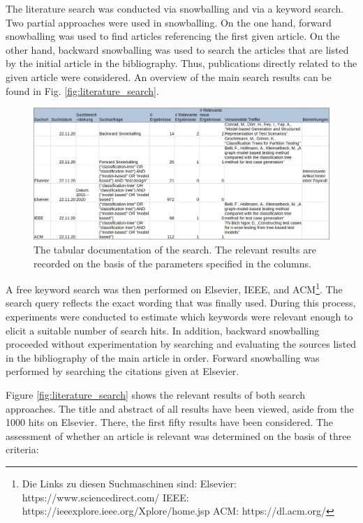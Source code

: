 The literature search was conducted via snowballing and via a keyword search. Two partial approaches were used in snowballing. On the one hand, forward snowballing was used to find articles referencing the first given article. On the other hand, backward snowballing was used to search the articles that are listed by the initial article in the bibliography. Thus, publications directly related to the given article were considered. An overview of the main search results can be found in Fig.  \autoref{fig:literature_search}. 

\begin{figure}[H]
\centering
\includegraphics[scale=0.32]{../../individual/groeger/images/Suchdokumentation.png} 
\caption{The tabular documentation of the search. The relevant results are recorded on the basis of the parameters specified in the columns.}
\label{fig:literature_search}
\end{figure}

A free keyword search was then performed on Elsevier, IEEE, and ACM\footnote{Die Links zu diesen Suchmaschinen sind: Elsevier: https://www.sciencedirect.com/ IEEE: https://ieeexplore.ieee.org/Xplore/home.jsp ACM: https://dl.acm.org/ }. The search query reflects the exact wording that was finally used. During this process, experiments were conducted to estimate which keywords were relevant enough to elicit a suitable number of search hits. In addition, backward snowballing proceeded without experimentation by searching and evaluating the sources listed in the bibliography of the main article in order. Forward snowballing was performed by searching the citations given at Elsevier.

Figure \autoref{fig:literature_search} shows the relevant results of both search approaches. The title and abstract of all results have been viewed, aside from the 1000 hits on Elsevier. There, the first fifty results have been considered. The assessment of whether an article is relevant was determined on the basis of three criteria:

